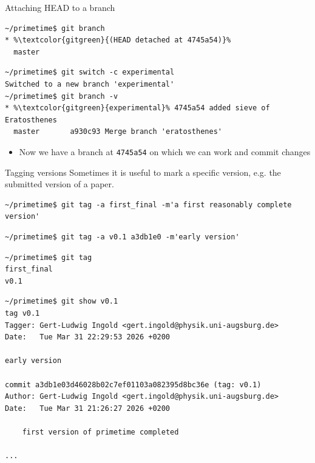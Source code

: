 \documentclass[svgnames]{beamer}
\begin{document}
\begin{frame}[fragile]{Attaching HEAD to a branch}
 \begin{lstlisting}[escapechar=\%]
~/primetime$ git branch
* %\textcolor{gitgreen}{(HEAD detached at 4745a54)}%
  master
 \end{lstlisting}
 \begin{lstlisting}[escapechar=\%]
~/primetime$ git switch -c experimental
Switched to a new branch 'experimental'
~/primetime$ git branch -v
* %\textcolor{gitgreen}{experimental}% 4745a54 added sieve of Eratosthenes
  master       a930c93 Merge branch 'eratosthenes'
 \end{lstlisting}
 \begin{itemize}
  \item Now we have a branch at \texttt{4745a54} on which we can work and commit
        changes
 \end{itemize}
\end{frame}

\begin{frame}[fragile]{Tagging versions}
 Sometimes it is useful to mark a specific version, e.g. the submitted version of a paper.

 \vspace{0.2truecm}
 \begin{lstlisting}[breaklines=true]
~/primetime$ git tag -a first_final -m'a first reasonably complete version'
 \end{lstlisting}

 \begin{lstlisting}
~/primetime$ git tag -a v0.1 a3db1e0 -m'early version'
 \end{lstlisting}

 \begin{lstlisting}
~/primetime$ git tag
first_final
v0.1
 \end{lstlisting}

 \begin{lstlisting}[basicstyle={\ttfamily\tiny}]
~/primetime$ git show v0.1
tag v0.1
Tagger: Gert-Ludwig Ingold <gert.ingold@physik.uni-augsburg.de>
Date:   Tue Mar 31 22:29:53 2026 +0200

early version

commit a3db1e03d46028b02c7ef01103a082395d8bc36e (tag: v0.1)
Author: Gert-Ludwig Ingold <gert.ingold@physik.uni-augsburg.de>
Date:   Tue Mar 31 21:26:27 2026 +0200

    first version of primetime completed

...
 \end{lstlisting}
\end{frame}
\end{document}
